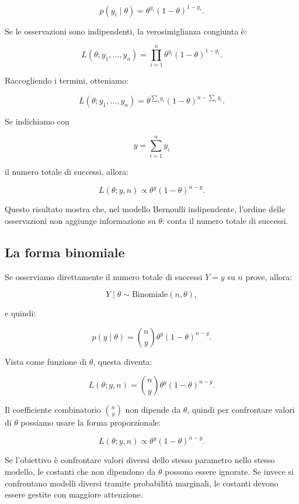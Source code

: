 \documentclass[
  italian,
  letterpaper,
  a4paper,
  11pt,
  open=any]{scrbook}
\theoremstyle{plain}
\theoremstyle{definition}
\theoremstyle{definition}
\theoremstyle{remark}
\begin{document}
\[
p(y_i \mid \theta) = \theta^{y_i}(1-\theta)^{1-y_i}.
\]

Se le osservazioni sono indipendenti, la verosimiglianza congiunta è:

\[
L(\theta; y_1, \ldots, y_n)
= \prod_{i=1}^{n} \theta^{y_i}(1-\theta)^{1-y_i}.
\]

Raccogliendo i termini, otteniamo:

\[
L(\theta; y_1, \ldots, y_n)
= \theta^{\sum_i y_i}(1-\theta)^{n-\sum_i y_i}.
\]

Se indichiamo con

\[
y = \sum_{i=1}^{n} y_i
\]

il numero totale di successi, allora:

\[
L(\theta; y, n) \propto \theta^y(1-\theta)^{n-y}.
\]

Questo risultato mostra che, nel modello Bernoulli indipendente,
l'ordine delle osservazioni non aggiunge informazione su \(\theta\):
conta il numero totale di successi.

\subsection{La forma binomiale}\label{la-forma-binomiale}

Se osserviamo direttamente il numero totale di successi \(Y=y\) su \(n\)
prove, allora:

\[
Y \mid \theta \sim \text{Binomiale}(n, \theta),
\]

e quindi:

\[
p(y \mid \theta) = {n \choose y}\theta^y(1-\theta)^{n-y}.
\]

Vista come funzione di \(\theta\), questa diventa:

\[
L(\theta; y,n) = {n \choose y}\theta^y(1-\theta)^{n-y}.
\]

Il coefficiente combinatorio \({n \choose y}\) non dipende da
\(\theta\), quindi per confrontare valori di \(\theta\) possiamo usare
la forma proporzionale:

\[
L(\theta; y,n) \propto \theta^y(1-\theta)^{n-y}.
\]

\begin{tcolorbox}[enhanced jigsaw, arc=.35mm, bottomrule=.15mm, bottomtitle=1mm, breakable, colback=white, colbacktitle=quarto-callout-note-color!10!white, colframe=quarto-callout-note-color-frame, coltitle=black, left=2mm, leftrule=.75mm, opacityback=0, opacitybacktitle=0.6, rightrule=.15mm, title=\textcolor{quarto-callout-note-color}{\faInfo}\hspace{0.5em}{Una costante può essere ignorata?}, titlerule=0mm, toprule=.15mm, toptitle=1mm]

Se l'obiettivo è confrontare valori diversi dello stesso parametro nello
stesso modello, le costanti che non dipendono da \(\theta\) possono
essere ignorate. Se invece si confrontano modelli diversi tramite
probabilità marginali, le costanti devono essere gestite con maggiore
attenzione.

\end{tcolorbox}
\end{document}

